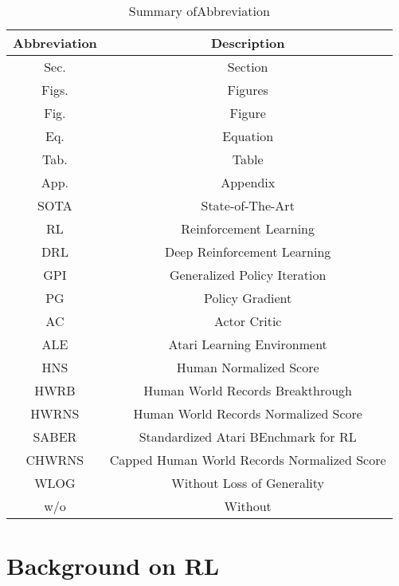\documentclass[nohyperref]{article}
\theoremstyle{plain}
\begin{document}
\begin{table}[!hb]
	\centering
	\caption{Summary ofAbbreviation}
	\label{tab: abbreviation}
	\begin{tabular}{|c| c|}
		\hline
		\textbf{Abbreviation} &\textbf{Description}\\
		\hline
		Sec.  & Section \citep{agent57} \\
		\hline
		Figs. & Figures \citep{dreamerv2} \\
		\hline
		Fig. & Figure \citep{agent57} \\
		\hline
		Eq.     & Equation \citep{agent57}\\
		\hline
		Tab.    & Table \citep{agent57} \\
		\hline
		App.    & Appendix \citep{agent57} \\
		\hline
		SOTA & State-of-The-Art \citep{agent57}    \\
		\hline
		RL  & Reinforcement Learning \citep{sutton} \\
		\hline
		DRL & Deep Reinforcement Learning \citep{sutton} \\
        \hline
        GPI & Generalized Policy Iteration \citep{sutton} \\
        \hline
        PG  & Policy Gradient \citep{sutton} \\
        \hline
        AC  & Actor Critic \citep{sutton} \\
\hline
        ALE & Atari Learning Environment \citep{ale} \\
        \hline
        HNS   & Human Normalized Score \citep{ale} \\
        \hline
        HWRB & Human World Records Breakthrough \\
        \hline
        HWRNS & Human World Records Normalized Score \\
        \hline
        SABER & Standardized Atari BEnchmark for RL \citep{atarihuman}\\
        \hline
        CHWRNS & Capped Human World Records Normalized Score \\      
        \hline
        WLOG   & Without Loss of Generality \\
        \hline
        w/o    & Without \\
		\hline
	\end{tabular} 
\end{table}



\clearpage
\section{Background on RL}
\label{app: background on RL}
\end{document}

